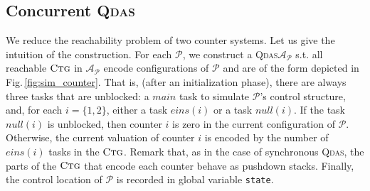 \documentclass[runningheads,oribibl,]{article}
\newcommand{\Aa}{\ensuremath{\mathcal{A}}\xspace}
\newcommand{\Pp}{\ensuremath{\mathcal{P}}\xspace}
\newcommand{\main}{\ensuremath{\textit{main}}\xspace}
\newcommand{\qdas}{\textsc{Qdas}\xspace}
\newcommand{\ctg}{\ensuremath{\textsc{Ctg}}\xspace}
\begin{document}
\subsection{Concurrent \qdas}

We reduce the reachability problem of two counter
systems. Let us give the intuition of the construction. For each
$\Pp$, we construct a \qdas $\Aa_\Pp$ s.t. all reachable \ctg in
$\Aa_\Pp$ encode configurations of $\Pp$ and are of the form depicted
in Fig.\,\ref{fig:sim_counter}. That is, (after an initialization
phase), there are always three tasks that are unblocked: a \main task
to simulate $\Pp$'s control structure, and, for each $i=\{1,2\}$,
either a task $eins(i)$ or a task $null(i)$. If the task $null(i)$ is
unblocked, then counter $i$ is zero in the current configuration of
$\Pp$. Otherwise, the current valuation of counter $i$ is encoded by
the number of $eins(i)$ tasks in the \ctg. Remark that, as in the case
of synchronous \qdas, the parts of the \ctg that encode each counter
behave as pushdown stacks. Finally, the control location of $\Pp$ is recorded in
global variable \texttt{state}.
\end{document}
